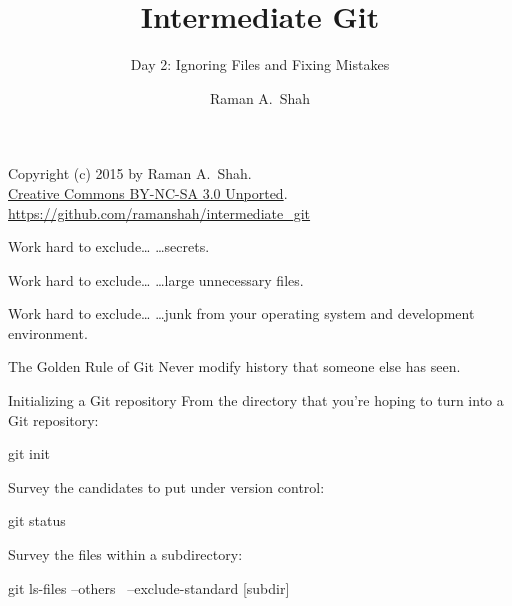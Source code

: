 

\title{Intermediate Git}
\subtitle{Day 2: Ignoring Files and Fixing Mistakes}
\author{Raman A.~Shah}
\date{}



\begin{frame}[plain]
  \titlepage
  \footnotesize{Copyright (c) 2015 by Raman A.~Shah.\\
  \href{https://creativecommons.org/licenses/by-nc-sa/3.0/legalcode}
       {Creative Commons BY-NC-SA 3.0 Unported}.\\
   \href{https://github.com/ramanshah/intermediate\_git}
        {https://github.com/ramanshah/intermediate\_git}}
\end{frame}

\begin{frame}{Work hard to exclude\ldots}
  \hangindent=26pt \huge {
  \ldots secrets.
  }
\end{frame}

\begin{frame}{Work hard to exclude\ldots}
  \hangindent=26pt \huge {
  \ldots large unnecessary files.
  }
\end{frame}

\begin{frame}{Work hard to exclude\ldots}
  \hangindent=26pt \huge {
  \ldots junk from your operating system and development environment.
  }
\end{frame}

\begin{frame}{The Golden Rule of Git}
  \huge {
  Never modify history that someone else has seen.
  }
\end{frame}

\begin{frame}[fragile]{Initializing a Git repository}
  From the directory that you're hoping to turn into a Git repository:

  \begin{gitCommand}git init\end{gitCommand}

  Survey the candidates to put under version control:

  \begin{gitCommand}git status\end{gitCommand}

  Survey the files within a subdirectory:

  \begin{gitCommand}git ls-files --others \
  --exclude-standard [subdir]
  \end{gitCommand}
\end{frame}

